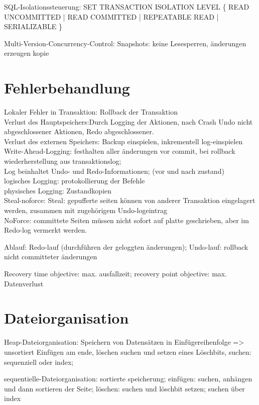 SQL-Isolationssteuerung: SET TRANSACTION ISOLATION LEVEL \{ READ UNCOMMITTED | READ COMMITTED | REPEATABLE READ | SERIALIZABLE \}

Multi-Version-Concurrency-Control: Snapshots: keine Lesesperren, änderungen erzeugen kopie

\section*{Fehlerbehandlung}
Lokaler Fehler in Transaktion: Rollback der Transaktion\\

Verlust des Hauptspeichers:Durch Logging der Aktionen, nach Crash Undo nicht abgeschlossener Aktionen, Redo abgeschlossener.\\
Verlust des externen Speichers: Backup einspielen, inkrementell log-einspielen\\


Write-Ahead-Logging: festhalten aller änderungen vor commit, bei rollback wiederherstellung aus transaktionslog;\\
Log beinhaltet Undo- und Redo-Informationen; (vor und nach zustand)\\
logisches Logging: protokollierung der Befehle\\
physisches Logging: Zustandkopien\\

Steal-noforce:
Steal: gepufferte seiten können von anderer Transaktion eingelagert werden, zusammen mit zugehörigem Undo-logeintrag\\
NoForce: committete Seiten müssen nicht sofort auf platte geschrieben, aber im Redo-log vermerkt werden.

Ablauf: Redo-lauf (durchführen der geloggten änderungen); Undo-lauf: rollback nicht committeter änderungen

Recovery time objective: max. ausfallzeit; recovery point objective: max. Datenverlust

\section*{Dateiorganisation}
Heap-Dateiorganisation: Speichern von Datensätzen in Einfügereihenfolge => unsortiert
Einfügen am ende, löschen suchen und setzen eines Löschbits, suchen: sequenziell oder index;

sequentielle-Dateiorganisation: sortierte speicherung;
einfügen: suchen, anhängen und dann sortieren der Seite; löschen: suchen und löschbit setzen; suchen über index


